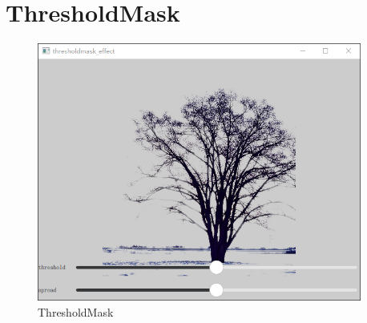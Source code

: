 ﻿




\FloatBarrier
\section{
ThresholdMask
}\label{c000015s000026}


\begin{figure}[htb] %
\marginnote{\setlength\fboxsep{2pt}\fbox{\footnotesize{\kaishu\figurename\,}\footnotesize{\ref{p000042}}}}\centering %
\includegraphics[width=0.95\textwidth]{../chapter06/thresholdmask_effect/the_app.png} %
\caption{ThresholdMask} %
\label{p000042} %
\end{figure}


